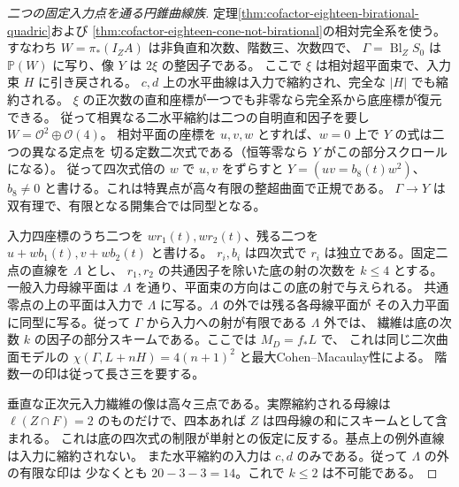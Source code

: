 \begin{proof}[二つの固定入力点を通る円錐曲線族]
定理\ref{thm:cofactor-eighteen-birational-quadric}および
\ref{thm:cofactor-eighteen-cone-not-birational}の相対完全系を使う。
すなわち $W=\pi_*(I_Z A)$ は非負直和次数、階数三、次数四で、
$\Gamma=\operatorname{Bl}_Z S_0$ は $\mathbb P(W)$ に写り、像 $Y$ は $2\xi$ の整因子である。
ここで $\xi$ は相対超平面束で、入力束 $H$ に引き戻される。
$c,d$ 上の水平曲線は入力で縮約され、完全な $|H|$ でも縮約される。
$\xi$ の正次数の直和座標が一つでも非零なら完全系から底座標が復元できる。
従って相異なる二水平縮約は二つの自明直和因子を要し $W=\mathcal O^2\oplus\mathcal O(4)$。
相対平面の座標を $u,v,w$ とすれば、$w=0$ 上で $Y$ の式は二つの異なる定点を
切る定数二次式である（恒等零なら $Y$ がこの部分スクロールになる）。
従って四次式倍の $w$ で $u,v$ をずらすと
$Y=(uv=b_8(t)w^2)$、$b_8\ne0$ と書ける。これは特異点が高々有限の整超曲面で正規である。
$\Gamma\to Y$ は双有理で、有限となる開集合では同型となる。

入力四座標のうち二つを $w r_1(t),w r_2(t)$、残る二つを $u+w b_1(t),v+w b_2(t)$ と書ける。
$r_i,b_i$ は四次式で $r_i$ は独立である。固定二点の直線を $\Lambda$ とし、
$r_1,r_2$ の共通因子を除いた底の射の次数を $k\le4$ とする。
一般入力母線平面は $\Lambda$ を通り、平面束の方向はこの底の射で与えられる。
共通零点の上の平面は入力で $\Lambda$ に写る。$\Lambda$ の外では残る各母線平面が
その入力平面に同型に写る。従って $\Gamma$ から入力への射が有限である $\Lambda$ 外では、
繊維は底の次数 $k$ の因子の部分スキームである。ここでは $M_D=f_*L$ で、
これは同じ二次曲面モデルの $\chi(\Gamma,L+nH)=4(n+1)^2$ と最大Cohen--Macaulay性による。
階数一の印は従って長さ三を要する。

垂直な正次元入力繊維の像は高々三点である。実際縮約される母線は
$\ell(Z\cap F)=2$ のものだけで、四本あれば $Z$ は四母線の和にスキームとして含まれる。
これは底の四次式の制限が単射との仮定に反する。基点上の例外直線は入力に縮約されない。
また水平縮約の入力は $c,d$ のみである。従って $\Lambda$ の外の有限な印は
少なくとも $20-3-3=14$。これで $k\le2$ は不可能である。
\end{proof}

